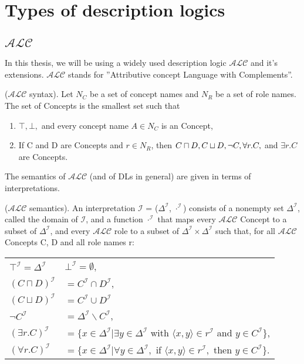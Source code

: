 \section{Types of description logics}
\subsection{$\mathcal{ALC}$}
In this thesis, we will be using a widely used description logic $\mathcal{ALC}$ and it's extensions.
$\mathcal{ALC}$ stands for  ''Attributive concept Language with Complements''.
\begin{mydef} 
\label{ALCsyntax}
\cite{handbook2}
($\mathcal{ALC}$ syntax). Let $N_C$ be a set of concept names and $N_R$ be a set of
role names. The set of Concepts is the smallest set such that
\begin{enumerate}
\item $ \top, \bot,$ and every concept name $A \in N_C$ is an Concept,
\item  If C and D are Concepts and $r \in N_R$, then $C \sqcap D,\\ C \sqcup D , \neg C, \forall r.C,$ and $\exists r.C$ are Concepts.
\end{enumerate}
\end{mydef}
The semantics of $\mathcal{ALC}$ (and of DLs in general) are given in terms of interpretations. 
\begin{mydef}
\label{ALCsemantics}
\cite{handbook2} 
($\mathcal{ALC}$ semantics). An interpretation $\mathcal{I}$ = ($\Delta ^\mathcal{I}$, $\cdot ^\mathcal{I}$) consists of a nonempty
set $\Delta ^\mathcal{I}$, called the domain of $\mathcal{I}$, and a function $\cdot ^\mathcal{I}$ that maps every $\mathcal{ALC}$ Concept
to a subset of $\Delta ^\mathcal{I}$, and every $\mathcal{ALC}$ role to a subset of $\Delta ^\mathcal{I} \times \Delta ^\mathcal{I}$ such that, for all $\mathcal{ALC}$ Concepts C, D and all role names r:\\
\begin{tabular}{l l}
 $\top ^\mathcal{I} = \Delta^\mathcal{I}$ & $\bot ^\mathcal{I} = \emptyset $, \\
$(C \sqcap D)^\mathcal{I}$ & $= C^\mathcal{I} \cap D^\mathcal{I}$,\\
 $(C \sqcup D) ^\mathcal{I}$ & $= C^\mathcal{I} \cup D^\mathcal{I}$\\
 $\neg C^\mathcal{I}$ & $= \Delta^\mathcal{I} \backslash C^\mathcal{I}$, \\
 $ (\exists r.C)^\mathcal{I}$ & $= \{x \in \Delta ^\mathcal{I} | \exists y \in \Delta ^\mathcal{I} $ with  $\langle x, y \rangle \in r^\mathcal{I}$ and $y \in C^\mathcal{I}\}$,\\
 $(\forall r.C)^\mathcal{I}$ & $= \{x \in \Delta ^\mathcal{I} | \forall y \in \Delta ^\mathcal{I},$ if $\langle x, y \rangle \in  r^\mathcal{I},$ then  $y \in C^\mathcal{I}\}$.\\
\end{tabular}
\end{mydef}


